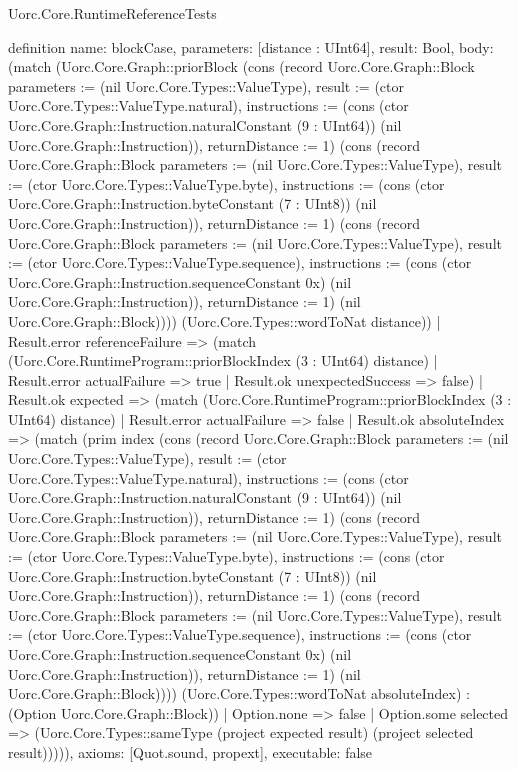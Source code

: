 \begin{lexlean}{Uorc.Core.RuntimeReferenceTests}
\begin{semanticmodule}
definition{
  name: blockCase,
  parameters: [distance : UInt64],
  result: Bool,
  body: (match (Uorc.Core.Graph::priorBlock (cons (record Uorc.Core.Graph::Block {parameters := (nil Uorc.Core.Types::ValueType), result := (ctor Uorc.Core.Types::ValueType.natural), instructions := (cons (ctor Uorc.Core.Graph::Instruction.naturalConstant (9 : UInt64)) (nil Uorc.Core.Graph::Instruction)), returnDistance := 1}) (cons (record Uorc.Core.Graph::Block {parameters := (nil Uorc.Core.Types::ValueType), result := (ctor Uorc.Core.Types::ValueType.byte), instructions := (cons (ctor Uorc.Core.Graph::Instruction.byteConstant (7 : UInt8)) (nil Uorc.Core.Graph::Instruction)), returnDistance := 1}) (cons (record Uorc.Core.Graph::Block {parameters := (nil Uorc.Core.Types::ValueType), result := (ctor Uorc.Core.Types::ValueType.sequence), instructions := (cons (ctor Uorc.Core.Graph::Instruction.sequenceConstant 0x) (nil Uorc.Core.Graph::Instruction)), returnDistance := 1}) (nil Uorc.Core.Graph::Block)))) (Uorc.Core.Types::wordToNat distance))
    | Result.error referenceFailure => (match (Uorc.Core.RuntimeProgram::priorBlockIndex (3 : UInt64) distance)
      | Result.error actualFailure => true
      | Result.ok unexpectedSuccess => false)
    | Result.ok expected => (match (Uorc.Core.RuntimeProgram::priorBlockIndex (3 : UInt64) distance)
      | Result.error actualFailure => false
      | Result.ok absoluteIndex => (match (prim index (cons (record Uorc.Core.Graph::Block {parameters := (nil Uorc.Core.Types::ValueType), result := (ctor Uorc.Core.Types::ValueType.natural), instructions := (cons (ctor Uorc.Core.Graph::Instruction.naturalConstant (9 : UInt64)) (nil Uorc.Core.Graph::Instruction)), returnDistance := 1}) (cons (record Uorc.Core.Graph::Block {parameters := (nil Uorc.Core.Types::ValueType), result := (ctor Uorc.Core.Types::ValueType.byte), instructions := (cons (ctor Uorc.Core.Graph::Instruction.byteConstant (7 : UInt8)) (nil Uorc.Core.Graph::Instruction)), returnDistance := 1}) (cons (record Uorc.Core.Graph::Block {parameters := (nil Uorc.Core.Types::ValueType), result := (ctor Uorc.Core.Types::ValueType.sequence), instructions := (cons (ctor Uorc.Core.Graph::Instruction.sequenceConstant 0x) (nil Uorc.Core.Graph::Instruction)), returnDistance := 1}) (nil Uorc.Core.Graph::Block)))) (Uorc.Core.Types::wordToNat absoluteIndex) : (Option Uorc.Core.Graph::Block))
        | Option.none => false
        | Option.some selected => (Uorc.Core.Types::sameType (project expected result) (project selected result))))),
  axioms: [Quot.sound, propext],
  executable: false
}


\end{semanticmodule}
\end{lexlean}
